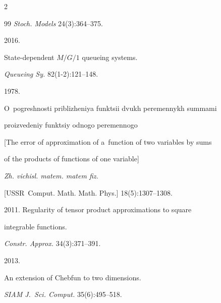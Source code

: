 \begin{multicols}{2}
{{\begin{thebibliography}{99}
\textit{Stoch. Models} 24(3):364--375.







 2016.


State-dependent ${M/G/1}$ queueing systems. 


\textit{Queueing Sy.} 82(1-2):121--148. 







 1978.


O~pogreshnosti priblizheniya funktsii dvukh peremennykh summami


proizvedeniy funktsiy odnogo peremennogo


[The error of approximation of a~function of two variables by sums 


of the products of functions of one variable]


\textit{Zh. vichisl. matem. matem fiz.}


[USSR\ Comput. Math. Math. Phys.] 18(5):1307--1308.







 2011. Regularity of tensor product approximations to square


integrable functions.


\textit{Constr. Approx.} 34(3):371--391.







 2013. 


An extension of Chebfun to two dimensions.


\textit{SIAM J.~Sci. Comput.} 35(6):495--518.








\end{thebibliography}





 }


 }





\end{multicols}





